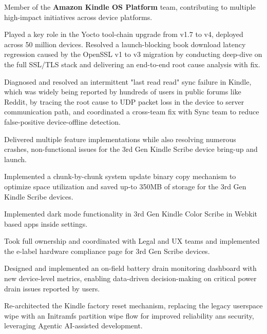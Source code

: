 \documentclass[11pt]{plushcv}
\begin{document}
\begin{tightemize}
\item Member of the \textbf{Amazon Kindle OS Platform} team, contributing to multiple high-impact initiatives across device platforms. 
\item Played a key role in the Yocto tool-chain upgrade from v1.7 to v4, deployed across 50 million devices. Resolved a launch-blocking book download latency regression caused by the OpenSSL v1 to v3 migration by conducting deep-dive on the full SSL/TLS stack and delivering an end-to-end root cause analysis with fix.
\item Diagnosed and resolved an intermittent "last read read" sync failure in Kindle, which was widely being reported by hundreds of users in public forums like Reddit, by tracing the root cause to UDP packet loss in the device to server communication path, and coordinated a cross-team fix with Sync team to reduce false-positive device-offline detection. 
\item Delivered multiple feature implementations while also resolving numerous crashes, non-functional issues for the 3rd Gen Kindle Scribe device bring-up and launch.
\item Implemented a chunk-by-chunk system update binary copy mechanism to optimize space utilization and saved up-to 350MB of storage for the 3rd Gen Kindle Scribe devices.
\item Implemented dark mode functionality in 3rd Gen Kindle Color Scribe in Webkit based apps inside settings.
\item Took full ownership and coordinated with Legal and UX teams and implemented the e-label hardware compliance page for 3rd Gen Scribe devices.
\item Designed and implemented an on-field battery drain monitoring dashboard with new device-level metrics, enabling data-driven decision-making on critical power drain issues reported by users.
\item Re-architected the Kindle factory reset mechanism, replacing the legacy userspace wipe with an Initramfs partition wipe flow for improved reliability ans security, leveraging Agentic AI-assisted development.
\end{tightemize}

\sectionsep
\end{document}

